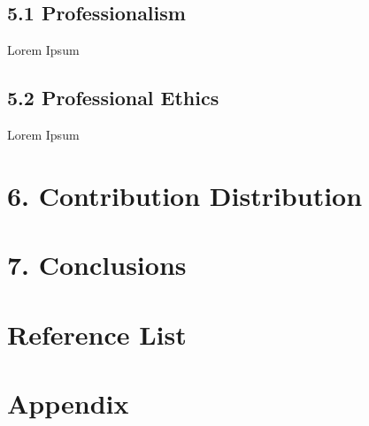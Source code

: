 \documentclass[11pt]{article}
\begin{document}
\subsection{5.1 Professionalism}
Lorem Ipsum

\subsection{5.2 Professional Ethics}
Lorem Ipsum



\section{6. Contribution Distribution}



\section{7. Conclusions}




\section{Reference List}



\section{Appendix}
\end{document}
